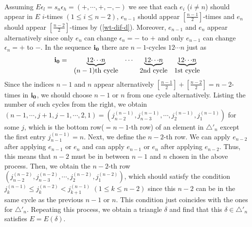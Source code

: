 Assuming $E{\epsilon}_l=s_n{\epsilon}_h=(+,{\cdots},+,-,-)$ we see that each 
$e_i$ ($i\ne n$) should appear in $E$ $i$-times $(1\leq i\leq n-2)$,
$e_{n-1}$ should appear $\left[\frac{n-1}{2}\right]$-times
and $e_n$ should appear $\left[\frac{n-2}{2}\right]$-times 
by (\ref{wt-dif-d}). Moreover, $e_{n-1}$ and $e_n$ appear alternatively
since only $e_n$ can change ${\epsilon}_n=-$ to $+$ and only $e_{n-1}$ can
change ${\epsilon}_n=+$ to $-$.
In the sequence $\bfii0$ there are $n-1$-cycles $12{\cdots} n$ just as
\[
\begin{array}{ccccc}
\bfii0=&  \underbrace{12{\cdots} n}&
{\cdots}  &\underbrace{12{\cdots} n}&\underbrace{12{\cdots} n}\\
&(n-1)\text{th cycle}&&2\text{nd cycle}&1
\text{st cycle}
\end{array}
\]
Since the indices $n-1$  and $n$ appear alternatively 
$\left[\frac{n-1}{2}\right]+\left[\frac{n-2}{2}\right]=n-2$-times
in $\bfii0$, 
we should choose $n-1$ or $n$ from one cycle alternatively. 
Listing the number of 
such cycles from the right, we obtain 
$(n-1,{\cdots},j+1,j-1,{\cdots},2,1)
=({j_{n-2}^{(n-1)}},{j_{n-3}^{(n-1)}},{\cdots},{j_{2}^{(n-1)}},{j_{1}^{(n-1)}})$ for 
some $j$, which is 
the bottom row($=n-1$-th row) of an element in ${\bigtriangleup}'_n$ except the
first entry ${j_{n-1}^{(n-1)}}=n$.
Next, we define the $n-2$-th row.
We can apply $e_{n-2}$ after applying $e_{n-1}$ or $e_n$ and can apply
$e_{n-1}$ or $e_n$ after applying $e_{n-2}$. Thus, this means 
that $n-2$ must be in between $n-1$ and $n$ chosen in the above process.
Then, we obtain the $n-2$-th row 
$({j_{n-2}^{(n-2)}},{j_{n-3}^{(n-2)}},{\cdots},{j_{2}^{(n-2)}},{j_{1}^{(n-2)}})$, which 
should satisfy the condition ${j_{k}^{(n-1)}}\leq {j_{k}^{(n-2)}}<{j_{k+1}^{(n-1)}}$
$(1\leq k\leq n-2)$ since this $n-2$ can be in the same cycle as 
the previous $n-1$ or $n$.
This condition just coincides with the ones for ${\bigtriangleup}'_n$.
Repeating this process, we obtain a triangle ${\delta}$ 
and find that this ${\delta}\in{\bigtriangleup}'_n$ satisfies $E=E({\delta})$.
{\hfill\framebox[2mm]{}}

